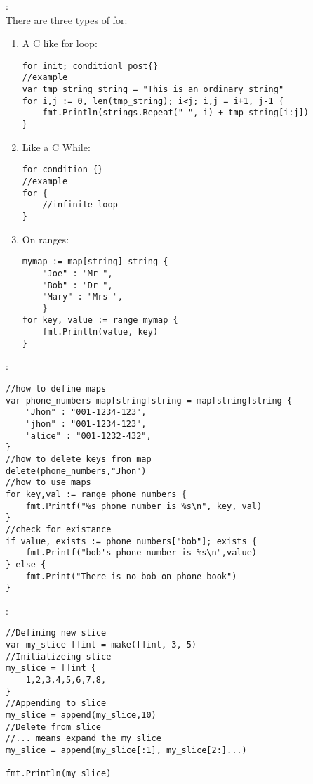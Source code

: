 \begin{note}[Loops]:\\
	There are three types of for:
\begin{enumerate}
\item A C like for loop:
\begin{lstlisting}[language = {Golang}]
for init; conditionl post{}
//example
var tmp_string string = "This is an ordinary string"
for i,j := 0, len(tmp_string); i<j; i,j = i+1, j-1 {
	fmt.Println(strings.Repeat(" ", i) + tmp_string[i:j])
}
\end{lstlisting}	
\item Like a C While:
\begin{lstlisting}[language=Golang]
for condition {}
//example
for {
	//infinite loop
}
\end{lstlisting}
\item On ranges:
\begin{lstlisting}[language=Golang]
mymap := map[string] string {
	"Joe" : "Mr ",
	"Bob" : "Dr ",
	"Mary" : "Mrs ",
	}		
for key, value := range mymap {
	fmt.Println(value, key)
}
\end{lstlisting}
\end{enumerate}
\end{note}
\begin{note}[Maps]:
\begin{lstlisting}[language=Golang]
//how to define maps
var phone_numbers map[string]string = map[string]string {
	"Jhon" : "001-1234-123",
	"jhon" : "001-1234-123",
	"alice" : "001-1232-432",
}
//how to delete keys fron map
delete(phone_numbers,"Jhon")
//how to use maps
for key,val := range phone_numbers {
	fmt.Printf("%s phone number is %s\n", key, val)
}
//check for existance
if value, exists := phone_numbers["bob"]; exists {
	fmt.Printf("bob's phone number is %s\n",value)
} else {
	fmt.Print("There is no bob on phone book")
}
\end{lstlisting}
\end{note}
\begin{note}[Slides]:
\begin{lstlisting}[language=Golang]
//Defining new slice
var my_slice []int = make([]int, 3, 5)
//Initializeing slice
my_slice = []int {
	1,2,3,4,5,6,7,8,
}
//Appending to slice
my_slice = append(my_slice,10)
//Delete from slice
//... means expand the my_slice
my_slice = append(my_slice[:1], my_slice[2:]...)

fmt.Println(my_slice)
\end{lstlisting}
\end{note}

